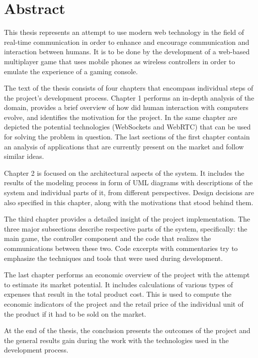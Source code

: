 \section*{Abstract}

This thesis represents an attempt to use modern web technology in the field of
real-time communication in order to enhance and encourage communication and
interaction between humans. It is to be done by the development of a web-based
multiplayer game that uses mobile phones as wireless controllers in order to
emulate the experience of a gaming console.

The text of the thesis consists of four chapters that encompass individual steps
of the project's development process. Chapter 1 performs an in-depth analysis of
the domain, provides a brief overview of how did human interaction with
computers evolve, and identifies the motivation for the project. In the same
chapter are depicted the potential technologies (WebSockets and WebRTC) that can
be used for solving the problem in question. The last sections of the first
chapter contain an analysis of applications that are currently present on the
market and follow similar ideas.

Chapter 2 is focused on the architectural aspects of the system. It includes the
results of the modeling process in form of UML diagrams with descriptions of the
system and individual parts of it, from different perspectives. Design decisions
are also specified in this chapter, along with the motivations that stood behind
them.

The third chapter provides a detailed insight of the project implementation. The
three major subsections describe respective parts of the system, specifically:
the main game, the controller component and the code that realizes the
communications between these two. Code excerpts with commentaries try to
emphasize the techniques and tools that were used during development.

The last chapter performs an economic overview of the project with the attempt
to estimate its market potential. It includes calculations of various types of
expenses that result in the total product cost. This is used to compute the
economic indicators of the project and the retail price of the individual unit
of the product if it had to be sold on the market.

At the end of the thesis, the conclusion presents the outcomes of the project
and the general results gain during the work with the technologies used in the
development process.


\clearpage
